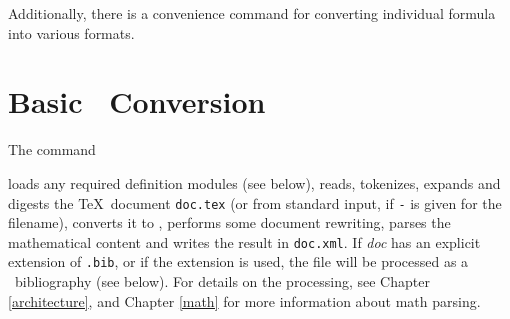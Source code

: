 \documentclass{book}
\begin{document}
Additionally, there is a convenience command 
for converting individual formula into various formats.

\section[Conversion]{Basic \XML\ Conversion}\label{usage.conversion}
The command
\begin{quote}
\end{quote}
loads any required definition modules (see below),
reads, tokenizes, expands and digests the \TeX\ document \texttt{doc.tex}
(or from standard input, if \texttt{-} is given for the filename),
converts it to \XML,
performs some document rewriting, parses the mathematical content
and writes the result in \texttt{doc.xml}.
If \textit{doc} has an explicit extension of \texttt{.bib}, or if
the  extension is used, the file will be processed
as a \BibTeX\ bibliography (see below).
For details on the processing, see Chapter \ref{architecture},
and Chapter \ref{math} for more information about math parsing.
\end{document}
